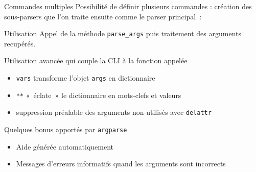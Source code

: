 \begin{frame}{Commandes multiples}
  Possibilité de définir plusieurs commandes : création des sous-parsers que l'on traite ensuite comme le parser principal~:

\end{frame}

\begin{frame}{Utilisation}
  Appel de la méthode \texttt{parse\_args} puis traitement des arguments recupérés.

\end{frame}

\begin{frame}{Utilisation avancée qui couple la CLI à la fonction appelée}

  \begin{itemize}
    \item \texttt{vars} transforme l'objet \texttt{args} en dictionnaire
    \item \texttt{**} «~éclate~» le dictionnaire en mots-clefs et valeurs
    \item suppression préalable des arguments non-utilisés avec \texttt{delattr}
  \end{itemize}
\end{frame}

\begin{frame}{Quelques bonus apportés par \texttt{argparse}}
  \begin{itemize}[<+->]
    \item Aide générée automatiquement
    \item Messages d'erreurs informatifs quand les arguments sont incorrects
  \end{itemize}
\end{frame}
